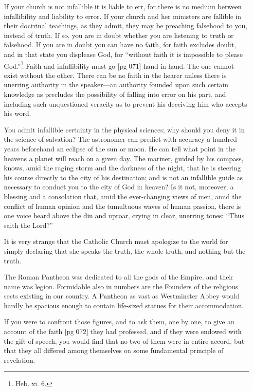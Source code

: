 If your church is not infallible it is liable to
err, for there is no medium between infallibility
and liability to error. If your church and her
ministers are fallible in their doctrinal teachings,
as they admit, they may be preaching falsehood
to you, instead of truth. If so, you are in doubt
whether you are listening to truth or falsehood.
If you are in doubt you can have no faith, for
faith excludes doubt, and in that state you displease
God, for “without faith it is impossible
to please God.”\footnote{Heb. xi. 6.}
Faith and infallibility must go
[pg 071]
hand in hand. The one cannot exist without the
other. There can be no faith in the hearer unless
there is unerring authority in the speaker—an authority
founded upon such certain knowledge as
precludes the possibility of falling into error on his
part, and including such unquestioned veracity as
to prevent his deceiving him who accepts his word.

You admit infallible certainty in the physical
sciences; why should you deny it in the science of
salvation? The astronomer can predict with accuracy
a hundred years beforehand an eclipse of the
sun or moon. He can tell what point in the heavens
a planet will reach on a given day. The mariner,
guided by his compass, knows, amid the raging
storm and the darkness of the night, that he is
steering his course directly to the city of his destination;
and is not an infallible guide as necessary
to conduct you to the city of God in heaven? Is it
not, moreover, a blessing and a consolation that,
amid the ever-changing views of men, amid the
conflict of human opinion and the tumultuous
waves of human passion, there is one voice heard
above the din and uproar, crying in clear, unerring
tones: “Thus saith the Lord?”

It is very strange that the Catholic Church must
apologize to the world for simply declaring that
she speaks the truth, the whole truth, and nothing
but the truth.

The Roman Pantheon was dedicated to all the
gods of the Empire, and their name was legion.
Formidable also in numbers are the Founders of
the religious sects existing in our country. A
Pantheon as vast as Westminster Abbey would
hardly be spacious enough to contain life-sized
statues for their accommodation.

If you were to confront those figures, and to ask
them, one by one, to give an account of the faith
[pg 072]
they had professed, and if they were endowed with
the gift of speech, you would find that no two of
them were in entire accord, but that they all differed
among themselves on some fundamental principle
of revelation.

